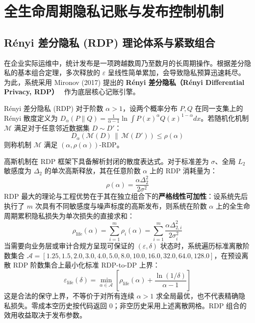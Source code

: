 \section{全生命周期隐私记账与发布控制机制}
\label{sec:accounting_release}

\subsection{Rényi 差分隐私 (RDP) 理论体系与紧致组合}
在企业实际运维中，统计发布是一项跨越数周乃至数月的长周期操作。根据差分隐私的基本组合定理，多次释放的 $\varepsilon$ 呈线性简单累加，会导致隐私预算迅速耗尽。为此，系统采用 Mironov (2017) 提出的 \textbf{Rényi 差分隐私（Rényi Differential Privacy, RDP）}~\cite{mironov2017renyi} 作为底层核心记账引擎。

\begin{definitionbox}{Rényi 差分隐私 (RDP)}
对于阶数 $\alpha > 1$，设两个概率分布 $P, Q$ 在同一支集上的 Rényi 散度定义为 $D_\alpha(P \parallel Q) = \frac{1}{\alpha - 1} \ln \int P(x)^\alpha Q(x)^{1-\alpha} dx$。若随机化机制 $\mathcal{M}$ 满足对于任意邻近数据集 $D \sim D'$：
\begin{equation}
  D_\alpha\left(\mathcal{M}(D) \,\parallel\, \mathcal{M}(D')\right) \le \rho(\alpha)
\end{equation}
则称机制 $\mathcal{M}$ 满足 $(\alpha, \rho(\alpha))$-RDP。
\end{definitionbox}

高斯机制在 RDP 框架下具备解析封闭的散度表达式。对于标准差为 $\sigma$、全局 $L_2$ 敏感度为 $\Delta_2$ 的单次高斯释放，其在任意阶数 $\alpha$ 上的 RDP 消耗量为：
\begin{equation}
  \label{eq:rdp_cost}
  \rho(\alpha) = \frac{\alpha \Delta_2^2}{2 \sigma^2}
\end{equation}
RDP 最大的理论与工程优势在于其在独立组合下的\textbf{严格线性可加性}：设系统先后执行了 $m$ 次具有不同敏感度与噪声标度的高斯发布，则系统在阶数 $\alpha$ 上的全生命周期累积隐私损失为单次损失的直接求和：
\begin{equation}
  \rho_{\text{life}}(\alpha) = \sum_{i=1}^m \rho_i(\alpha) = \sum_{i=1}^m \frac{\alpha \Delta_{2, i}^2}{2 \sigma_i^2}
\end{equation}
当需要向业务层或审计合规方呈现可保证的 $(\varepsilon, \delta)$ 状态时，系统遍历标准离散阶数集合 $\mathcal{A} = [1.25, 1.5, 2.0, 3.0, 4.0, 5.0, 8.0, 10.0, 16.0, 32.0, 64.0, 128.0]$，在预设离散 RDP 阶数集合上最小化标准 RDP-to-DP 上界：
\begin{equation}
  \label{eq:rdp_conversion}
  \varepsilon_{\text{life}}(\delta) = \min_{\alpha \in \mathcal{A}} \left[ \rho_{\text{life}}(\alpha) + \frac{\ln(1/\delta)}{\alpha - 1} \right]
\end{equation}
这是合法的保守上界，不等价于对所有连续 $\alpha>1$ 求全局最优，也不代表精确隐私损失。零成本空历史按代码返回 $0$；非空历史采用上述离散网格。RDP 组合的效用收益取决于发布参数。

